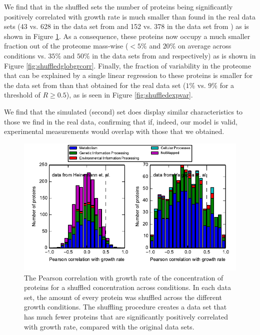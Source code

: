 \documentclass[a4paper]{article}
\begin{document}
We find that in the shuffled sets the number of proteins being significantly positively correlated with
growth rate is much smaller than found in the real data sets (43 vs. 628 in the data set from \cite{Heinemann2015} and 152 vs. 378 in the data set from \cite{Valgepea2013}) as is shown in Figure \ref{fig:shuffledcorr}.
As a consequence, these proteins now occupy a much smaller fraction out of the proteome mass-wise ($<5\%$ and $20\%$ on average across conditions vs. $35\%$ and $50\%$ in the data sets from \cite{Heinemann2015} and \cite{Valgepea2013} respectively) as is shown in Figure \ref{fig:shuffledglobgrcorr}.
Finally, the fraction of variability in the proteome that can be explained by a single linear regression to these proteins is smaller for the data set from \cite{Heinemann2015} than that obtained for the real data set ($1\%$ vs. $9\%$ for a threshold of $R\ge0.5$), as is seen in Figure \ref{fig:shuffledexpvar}.

We find that the simulated (second) set does display similar characteristics to those we find in the real data, confirming that if, indeed, our model is valid, experimental measurements would overlap with those that we obtained.

\begin{figure}[H]
\begin{center}
\includegraphics[width=1\columnwidth]{shuffleGrowthRateCorrelation.pdf}
\caption{\label{fig:shuffledcorr}
The Pearson correlation with growth rate of the concentration of proteins for a shuffled concentration across conditions.
In each data set, the amount of every protein was shuffled across the different growth conditions.
The shuffling procedure creates a data set that has much fewer proteins that are significantly positively correlated with growth rate, compared with the original data sets.}
\end{center}
\end{figure}
\end{document}
